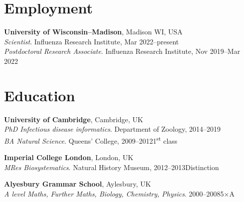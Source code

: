 \documentclass[margin]{res}
\begin{document}
\address{
	e: david.pattinson[at]wisc.edu\\
	t: +1 (516) 413 4078\\
	dob: 19\textsuperscript{th} Sep 1989\\
	\url{https://github.com/davipatti}
}
\address{
	Influenza Research Institute\\
	Science Dr.\\
	Madison, WI 53711\\
	USA
}

\begin{resume}

    \section{Employment}
    \textbf{University of Wisconsin--Madison}, Madison WI, USA\\
    {\sl Scientist}. Influenza Research Institute, Mar 2022--present\\
    {\sl Postdoctoral Research Associate}. Influenza Research Institute, Nov 2019--Mar 2022

	\section{Education}
	\textbf{University of Cambridge}, Cambridge, UK\\
	{\sl PhD Infectious disease informatics}. Department of Zoology, 2014--2019\\
	{\sl BA Natural Science}. Queens' College, 2009--2012\hfill 1\textsuperscript{st} class

	\textbf{Imperial College London}, London, UK\\
	{\sl MRes Biosystematics}. Natural History Museum, 2012--2013\hfill Distinction

	\textbf{Alyesbury Grammar School}, Aylesbury, UK\\
	{\sl A level Maths, Further Maths, Biology, Chemistry, Physics}. 2000--2008\hfill 5$\times$A


\end{resume}
\end{document}
